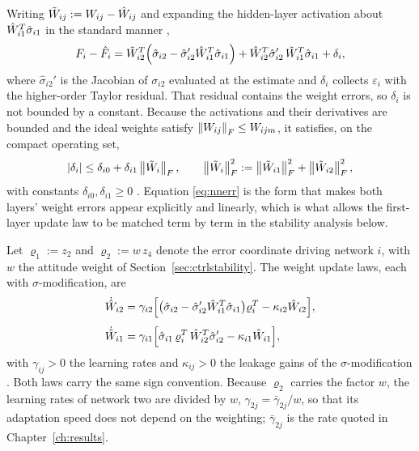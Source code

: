 Writing $\tilde{W}_{ij}:=W_{ij}-\hat{W}_{ij}$ and expanding the hidden-layer activation
about $\hat{W}_{i1}^T\hat\sigma_{i1}$ in the standard manner
\cite{lewis1999neural},
\begin{equation}\label{eq:nnerr}
F_i-\hat F_i
=\tilde{W}_{i2}^T\Bigl(\hat\sigma_{i2}-\hat\sigma_{i2}'\hat{W}_{i1}^T\hat\sigma_{i1}\Bigr)
+\hat{W}_{i2}^T\hat\sigma_{i2}'\,\tilde{W}_{i1}^T\hat\sigma_{i1}
+\delta_i ,
\end{equation}
where $\hat\sigma_{i2}'$ is the Jacobian of $\sigma_{i2}$ evaluated at the
estimate and $\delta_i$ collects $\varepsilon_i$ with the higher-order Taylor
residual. That residual contains the weight errors, so $\delta_i$ is not bounded
by a constant. Because the activations and their derivatives are bounded and the
ideal weights satisfy $\left\lVert W_{ij} \right\rVert_F\le W_{ijm}$, it satisfies, on the compact
operating set,
\begin{equation}\label{eq:wbound}
\left\lvert \delta_i \right\rvert\le\delta_{i0}+\delta_{i1}\left\lVert \tilde{W}_i \right\rVert_F,
\qquad \left\lVert \tilde{W}_i \right\rVert_F^2:=\left\lVert \tilde{W}_{i1} \right\rVert_F^2+\left\lVert \tilde{W}_{i2} \right\rVert_F^2,
\end{equation}
with constants $\delta_{i0},\delta_{i1}\ge0$ \cite{lewis1999neural}.
Equation \eqref{eq:nnerr} is the form that makes both layers' weight errors
appear explicitly and linearly, which is what allows the first-layer update law
to be matched term by term in the stability analysis below.

Let $\varrho_1:=z_2$ and $\varrho_2:=w\,z_4$ denote the error coordinate driving
network $i$, with $w$ the attitude weight of Section~\ref{sec:ctrlstability}.
The weight update laws, each with $\sigma$-modification, are
\begin{align}
\dot{\hat{W}}_{i2}&=\gamma_{i2}\Bigl[
\bigl(\hat\sigma_{i2}-\hat\sigma_{i2}'\hat{W}_{i1}^T\hat\sigma_{i1}\bigr)\varrho_i^T
-\kappa_{i2}\hat{W}_{i2}\Bigr],
\label{eq:upd2}\\[4pt]
\dot{\hat{W}}_{i1}&=\gamma_{i1}\Bigl[
\hat\sigma_{i1}\,\varrho_i^T\,\hat{W}_{i2}^T\hat\sigma_{i2}'
-\kappa_{i1}\hat{W}_{i1}\Bigr],
\label{eq:upd1}
\end{align}
with $\gamma_{ij}>0$ the learning rates and $\kappa_{ij}>0$ the leakage gains of
the $\sigma$-modification \cite{ioannou1983adaptive,ioannou1984sigma}. Both
laws carry the same sign convention. Because $\varrho_2$ carries the factor
$w$, the learning rates of network two are divided by $w$,
$\gamma_{2j}=\bar\gamma_{2j}/w$, so that its adaptation speed does not depend on
the weighting; $\bar\gamma_{2j}$ is the rate quoted in Chapter~\ref{ch:results}.


